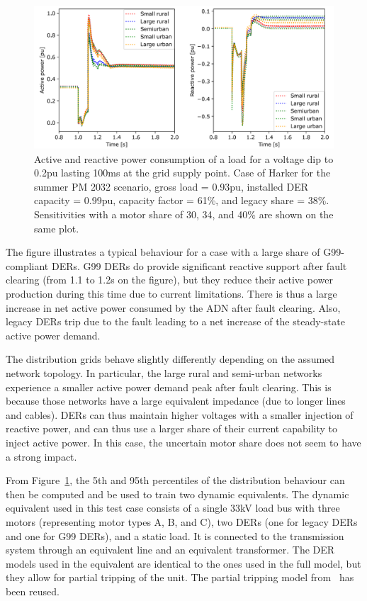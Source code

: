 \begin{figure}
    \centering
    \includegraphics[width=\linewidth]{Figs/CIGRE_equiv.png}
    \caption{Active and reactive power consumption of a load for a voltage dip to 0.2pu lasting 100ms at the grid supply point. Case of Harker for the summer PM 2032 scenario, \ie gross load = 0.93pu, installed DER capacity = 0.99pu, capacity factor = 61\%, and legacy share = 38\%. Sensitivities with a motor share of 30, 34, and 40\% are shown on the same plot.}
    \label{fig:CIGRE_equiv}
\end{figure}

The figure illustrates a typical behaviour for a case with a large share of G99-compliant DERs. G99 DERs do provide significant reactive support after fault clearing (from 1.1 to 1.2s on the figure), but they reduce their active power production during this time due to current limitations. There is thus a large increase in net active power consumed by the ADN after fault clearing. Also, legacy DERs trip due to the fault leading to a net increase of the steady-state active power demand.

The distribution grids behave slightly differently depending on the assumed network topology. In particular, the large rural and semi-urban networks experience a smaller active power demand peak after fault clearing. This is because those networks have a large equivalent impedance (due to longer lines and cables). DERs can thus maintain higher voltages with a smaller injection of reactive power, and can thus use a larger share of their current capability to inject active power. In this case, the uncertain motor share does not seem to have a strong impact.

From Figure~\ref{fig:CIGRE_equiv}, the 5th and 95th percentiles of the distribution behaviour can then be computed and be used to train two dynamic equivalents. The dynamic equivalent used in this test case consists of a single 33kV load bus with three motors (representing motor types A, B, and C), two DERs (one for legacy DERs and one for G99 DERs), and a static load. It is connected to the transmission system through an equivalent line and an equivalent transformer. The DER models used in the equivalent are identical to the ones used in the full model, but they allow for partial tripping of the unit. The partial tripping model from~\cite{ChaspierreThesis} has been reused.


